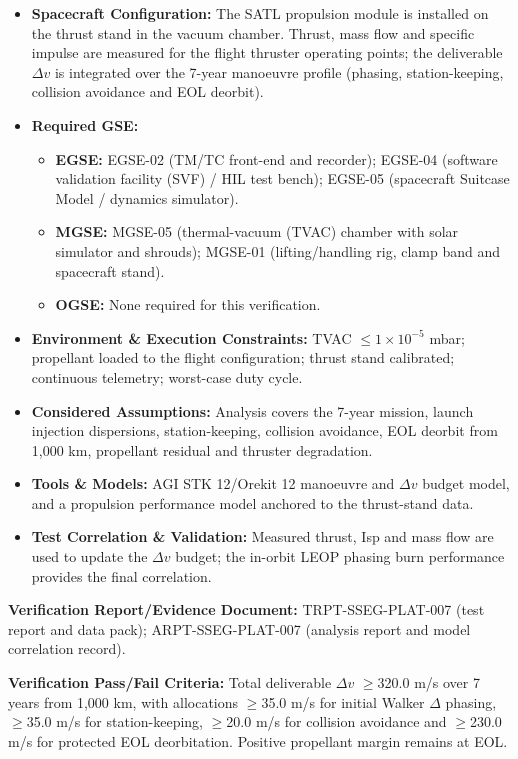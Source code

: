 \begin{itemize}
\item \textbf{Spacecraft Configuration:} The SATL propulsion module is installed on the thrust stand in the vacuum chamber. Thrust, mass flow and specific impulse are measured for the flight thruster operating points; the deliverable $\Delta v$ is integrated over the 7-year manoeuvre profile (phasing, station-keeping, collision avoidance and EOL deorbit).
\item \textbf{Required GSE:}
\begin{itemize}
\item \textbf{EGSE:} EGSE-02 (TM/TC front-end and recorder); EGSE-04 (software validation facility (SVF) / HIL test bench); EGSE-05 (spacecraft Suitcase Model / dynamics simulator).
\item \textbf{MGSE:} MGSE-05 (thermal-vacuum (TVAC) chamber with solar simulator and shrouds); MGSE-01 (lifting/handling rig, clamp band and spacecraft stand).
\item \textbf{OGSE:} None required for this verification.
\end{itemize}
\item \textbf{Environment \& Execution Constraints:} TVAC $\le$$1\times10^{-5}$ mbar; propellant loaded to the flight configuration; thrust stand calibrated; continuous telemetry; worst-case duty cycle.
\item \textbf{Considered Assumptions:} Analysis covers the 7-year mission, launch injection dispersions, station-keeping, collision avoidance, EOL deorbit from 1,000 km, propellant residual and thruster degradation.
\item \textbf{Tools \& Models:} AGI STK 12/Orekit 12 manoeuvre and $\Delta v$ budget model, and a propulsion performance model anchored to the thrust-stand data.
\item \textbf{Test Correlation \& Validation:} Measured thrust, Isp and mass flow are used to update the $\Delta v$ budget; the in-orbit LEOP phasing burn performance provides the final correlation.
\end{itemize}
\par\textbf{Verification Report/Evidence Document:} TRPT-SSEG-PLAT-007 (test report and data pack); ARPT-SSEG-PLAT-007 (analysis report and model correlation record).
\par\textbf{Verification Pass/Fail Criteria:} Total deliverable $\Delta v$ $\ge$320.0 m/s over 7 years from 1,000 km, with allocations $\ge$35.0 m/s for initial Walker $\Delta$ phasing, $\ge$35.0 m/s for station-keeping, $\ge$20.0 m/s for collision avoidance and $\ge$230.0 m/s for protected EOL deorbitation. Positive propellant margin remains at EOL.
\par\medskip
